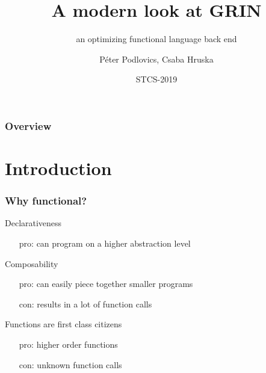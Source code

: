 \documentclass[bigger]{beamer}
\title[GRIN] %
{A modern look at GRIN}
\subtitle{an optimizing functional language back end}
\author[P. Podlovics, Cs. Hruska ] %
{Péter Podlovics, Csaba Hruska}
\institute[ELTE] %
{
	Eötvös Loránd University (ELTE), \\ Budapest, Hungary
}
\date{STCS-2019} %
\begin{document}
	
{
	\frame{\vspace{15mm}\titlepage}
}

\begin{frame}
	\frametitle{Overview}
	\tableofcontents
\end{frame}


\section{Introduction}

\begin{frame}[fragile]
	\frametitle{Why functional?}
	
	\begin{vfitemize}
		\item Declarativeness
			\begin{itemize}
				\item[pro:] can program on a higher abstraction level
			\end{itemize}
		\item Composability\\
			\begin{itemize}
				\item[pro:] can easily piece together smaller programs
				\item[con:] results in a lot of function calls
			\end{itemize}
		\item Functions are first class citizens
			\begin{itemize}
				\item[pro:] higher order functions
				\item[con:] unknown function calls
			\end{itemize}
	\end{vfitemize}

\end{frame}
\end{document}
